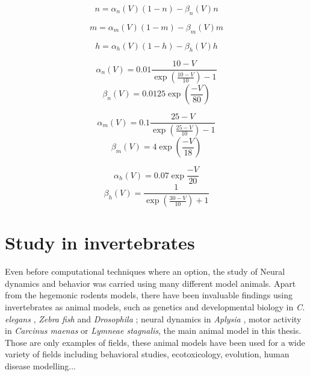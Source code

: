 \begin{multicols}{2}
	\begin{equation}
		n = \alpha_n (V)(1-n)-\beta_n(V)n
	\end{equation}

	\begin{equation}
		m = \alpha_m (V)(1-m)-\beta_m(V)m
	\end{equation}
	
	\begin{equation}
		h = \alpha_h (V)(1-h)-\beta_h(V)h
	\end{equation}

	\vspace{20pt}

	\begin{equation}
	\alpha_n(V)=0.01\frac{10-V}	{\exp(\frac{10-V}{10})-1}
	\end{equation}
	\begin{equation}
	\beta_n(V)=0.0125\exp(\frac{-V}{80})
	\end{equation}


\vspace{-15pt}
	\begin{equation}
		\alpha_m(V)=0.1\frac{25-V}{\exp(\frac{25-V}{10})-1}
	\end{equation}
	\begin{equation}
		\beta_m(V)=4\exp(\frac{-V}{18})
	\end{equation}

\vspace{-15pt}
	\begin{equation}
	\alpha_h(V)=0.07\exp\frac{-V}{20}
	\end{equation}
	\begin{equation}
		\beta_h(V)=\frac{1}{\exp(\frac{30-V}{10})+1}
	\end{equation}
\end{multicols}

\section{Study in invertebrates}
Even before computational techniques where an option, the study of Neural dynamics and behavior was carried using many different model animals. Apart from the hegemonic rodents models, there have been invaluable findings using invertebrates as animal models, such as genetics and developmental biology in \textit{C. elegans} \cite{brenner_genetics_1974}, \textit{Zebra fish} \cite{streisinger_production_1981} and \textit{Drosophila} \cite{nusslein-volhard_mutations_1980}; neural dynamics in \textit{Aplysia} \cite{HODGKIN1952,wachtel_direct_1967}, motor activity in \textit{Carcinus maenas} \cite{eisen} or \textit{Lymneae stagnalis}, the main animal model in this thesis. Those are only examples of fields, these animal models have been used for a wide variety of fields including behavioral studies, ecotoxicology, evolution, human disease modelling... \cite{romanova_animal_2018} 

